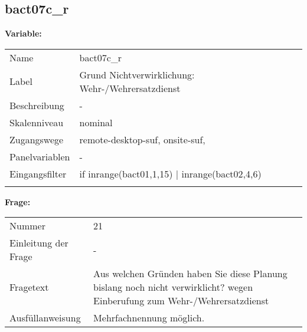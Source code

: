	
	
	\subsection{bact07c\_r}
	\label{subSection:bact07c_r}

	\noindent\textbf{Variable:}\\
		\begin{tabular}{lL{11.3cm}}
			\label{tableVariable:bact07c_r}
			Name & bact07c\_r \\
			Label & Grund Nichtverwirklichung: Wehr-/Wehrersatzdienst \\
			Beschreibung & - \\
			Skalenniveau & nominal \\
			Zugangswege &
				remote-desktop-suf,
				onsite-suf,
 \\
			Panelvariablen & -
			 \\
			Eingangsfilter & if inrange(bact01,1,15) | inrange(bact02,4,6) \\
 \\
		\end{tabular}

		\vspace*{1 cm}
		\noindent\textbf{Frage:}\\
		\begin{tabular}{lL{11.3cm}}
			\label{tableQuestion:bact07c_r}
			Nummer & 21 \\
			Einleitung der Frage & - \\
			Fragetext & Aus welchen Gründen haben Sie diese Planung bislang noch nicht verwirklicht?
wegen Einberufung zum Wehr-/Wehrersatzdienst \\
			Ausfüllanweisung & Mehrfachnennung möglich. \\
		\end{tabular}





